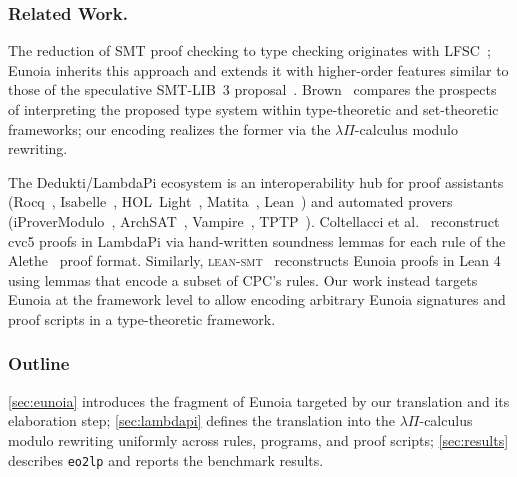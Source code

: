 \documentclass[class=llncs, crop=false]{standalone}
\begin{document}
\subsubsection{Related Work.}
The reduction of SMT proof checking to type
checking originates with
LFSC~\cite{DBLP:journals/fmsd/StumpORHT13};
Eunoia inherits this approach and extends it with
higher-order features similar to those of the
speculative SMT-LIB~3
proposal~\cite{barrettSMTLIB3Bringing,smt3-proposal,barbosa17hosmt}.
%
Brown~\cite{Brown2021} compares the prospects of interpreting
the proposed type system within type-theoretic and set-theoretic
frameworks; our encoding realizes the former via the $λΠ$-calculus
modulo rewriting.

The Dedukti/LambdaPi ecosystem is an interoperability hub for
proof assistants (Rocq~\cite{boespflug12coqine},
Isabelle~\cite{isabelle_dedukti},
HOL~Light~\cite{assaf15translating},
Matita~\cite{krajono},
Lean~\cite{vaishnav25lean4less})
and automated provers
(iProverModulo~\cite{burel20first},
ArchSAT~\cite{bury:tel-02612985},
Vampire~\cite{komel2025case},
TPTP~\cite{DBLP:conf/flairs/SutcliffeBB25}).
%
Coltellacci et al.~\cite{coltellacciReconstructionSMTProofs2024a,coltellacci25frocos}
reconstruct cvc5 proofs in LambdaPi via hand-written soundness lemmas for
each rule of the Alethe~\cite{schurrAletheGenericSMT2021} proof format.
%
Similarly, \textsc{lean-smt}~\cite{mohamed25leansmt}
reconstructs Eunoia proofs in Lean 4 using lemmas
that encode a subset of CPC's rules.
%
Our work instead targets Eunoia at the framework
level to allow encoding arbitrary
Eunoia signatures and proof scripts
in a type-theoretic framework.


\subsubsection*{Outline}
%
\autoref{sec:eunoia} introduces the fragment of Eunoia
targeted by our translation and its elaboration step;
\autoref{sec:lambdapi} defines the translation into the
$λΠ$-calculus modulo rewriting uniformly across rules,
programs, and proof scripts;
\autoref{sec:results} describes \texttt{eo2lp} and
reports the benchmark results.

%
\end{document}
